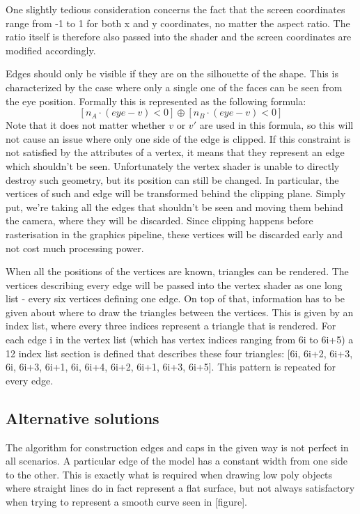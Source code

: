 \documentclass[a4paper, 12pt]{article}
\begin{document}
One slightly tedious consideration concerns the fact that the screen coordinates range from -1 to 1 for both x and y coordinates, no matter the aspect ratio. The ratio itself is therefore also passed into the shader and the screen coordinates are modified accordingly.

Edges should only be visible if they are on the silhouette of the shape. This is characterized by the case where only a single one of the faces can be seen from the eye position. Formally this is represented as the following formula:
$$[n_A \cdot (eye-v) < 0] \oplus [n_B \cdot (eye-v) < 0]$$
Note that it does not matter whether $v$ or $v'$ are used in this formula, so this will not cause an issue where only one side of the edge is clipped. If this constraint is not satisfied by the attributes of a vertex, it means that they represent an edge which shouldn't be seen. Unfortunately the vertex shader is unable to directly destroy such geometry, but its position can still be changed. In particular, the vertices of such and edge will be transformed behind the clipping plane. Simply put, we're taking all the edges that shouldn't be seen and moving them behind the camera, where they will be discarded. Since clipping happens before rasterisation in the graphics pipeline, these vertices will be discarded early and not cost much processing power.

When all the positions of the vertices are known, triangles can be rendered. The vertices describing every edge will be passed into the vertex shader as one long list - every six vertices defining one edge. On top of that, information has to be given about where to draw the triangles between the vertices. This is given by an index list, where every three indices represent a triangle that is rendered. For each edge i in the vertex list (which has vertex indices ranging from 6i to 6i+5) a 12 index list section is defined that describes these four triangles: [6i, 6i+2, 6i+3, 6i, 6i+3, 6i+1, 6i, 6i+4, 6i+2, 6i+1, 6i+3, 6i+5]. This pattern is repeated for every edge.


\subsection{Alternative solutions}
The algorithm for construction edges and caps in the given way is not perfect in all scenarios. A particular edge of the model has a constant width from one side to the other. This is exactly what is required when drawing low poly objects where straight lines do in fact represent a flat surface, but not always satisfactory when trying to represent a smooth curve seen in [figure].
\end{document}
